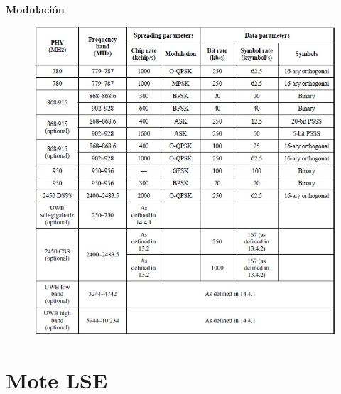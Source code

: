 \documentclass[aspectratio=169]{beamer}
\begin{document}
\begin{frame}{\textbf{Modulación}}
\begin{minipage}[c]{1.0\linewidth}
\begin{figure}[H]
	\includegraphics[height=1\textheight]{./imagenes/modulaciones.jpg}
		\end{figure}	
\end{minipage}
\end{frame}

\section{Mote LSE}

\end{document}
